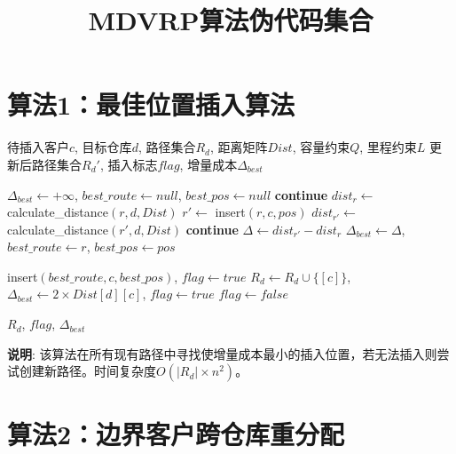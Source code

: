 \documentclass[12pt,a4paper]{article}
\title{MDVRP算法伪代码集合}
\author{}
\date{}
\begin{document}
\maketitle

\section{算法1：最佳位置插入算法}

\begin{algorithm}[H]
\caption{最佳位置插入算法}
\label{alg:best-insertion}
\begin{algorithmic}[1]
\REQUIRE 待插入客户$c$, 目标仓库$d$, 路径集合$R_d$, 距离矩阵$Dist$, 容量约束$Q$, 里程约束$L$
\ENSURE 更新后路径集合$R_d'$, 插入标志$flag$, 增量成本$\Delta_{best}$

\STATE $\Delta_{best} \gets +\infty$, $best\_route \gets null$, $best\_pos \gets null$
        \STATE \textbf{continue}  
    \ENDIF
    \STATE $dist_r \gets$ calculate\_distance$(r, d, Dist)$
        \STATE $r' \gets$ insert$(r, c, pos)$
        \STATE $dist_{r'} \gets$ calculate\_distance$(r', d, Dist)$
            \STATE \textbf{continue}  
        \ENDIF
        \STATE $\Delta \gets dist_{r'} - dist_r$
            \STATE $\Delta_{best} \gets \Delta$, $best\_route \gets r$, $best\_pos \gets pos$
        \ENDIF
    \ENDFOR
\ENDFOR

    \STATE insert$(best\_route, c, best\_pos)$, $flag \gets true$  
    \STATE $R_d \gets R_d \cup \{[c]\}$, $\Delta_{best} \gets 2 \times Dist[d][c]$, $flag \gets true$  
\ELSE
    \STATE $flag \gets false$  
\ENDIF

\RETURN $R_d$, $flag$, $\Delta_{best}$
\end{algorithmic}
\end{algorithm}

\textbf{说明}: 该算法在所有现有路径中寻找使增量成本最小的插入位置，若无法插入则尝试创建新路径。时间复杂度$O(|R_d| \times n^2)$。

\newpage

\section{算法2：边界客户跨仓库重分配}
\end{document}
